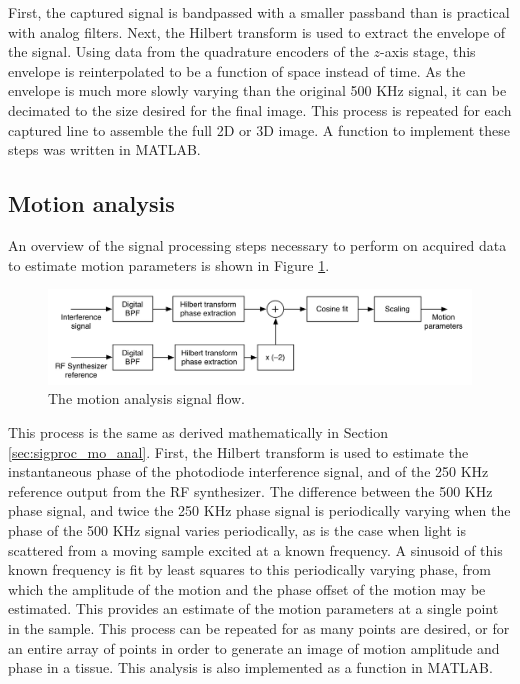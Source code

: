 First, the captured signal is bandpassed with a smaller passband than is practical with analog filters. Next, the Hilbert transform is used to extract the envelope of the signal. Using data from the quadrature encoders of the $z$-axis stage, this envelope is reinterpolated to be a function of space instead of time. As the envelope is much more slowly varying than the original 500 KHz signal, it can be decimated to the size desired for the final image. This process is repeated for each captured line to assemble the full 2D or 3D image. A function to implement these steps was written in MATLAB.

\subsection{Motion analysis}
\label{sec:motion_analysis_2}

An overview of the signal processing steps necessary to perform on acquired data to estimate motion parameters is shown in Figure \ref{fig:motion_analysis_block_diagram}.

\begin{figure}[h!]
\centering
\includegraphics[width=1.0\textwidth]{Images/Background/motion_process.png}
\caption{The motion analysis signal flow. \label{fig:motion_analysis_block_diagram}}
\end{figure}

This process is the same as derived mathematically in Section \ref{sec:sigproc_mo_anal}. First, the Hilbert transform is used to estimate the instantaneous phase of the photodiode interference signal, and of the 250 KHz reference output from the RF synthesizer. The difference between the 500 KHz phase signal, and twice the 250 KHz phase signal is periodically varying when the phase of the 500 KHz signal varies periodically, as is the case when light is scattered from a moving sample excited at a known frequency. A sinusoid of this known frequency is fit by least squares to this periodically varying phase, from which the amplitude of the motion and the phase offset of the motion may be estimated. This provides an estimate of the motion parameters at a single point in the sample. This process can be repeated for as many points are desired, or for an entire array of points in order to generate an image of motion amplitude and phase in a tissue. This analysis is also implemented as a function in MATLAB.

